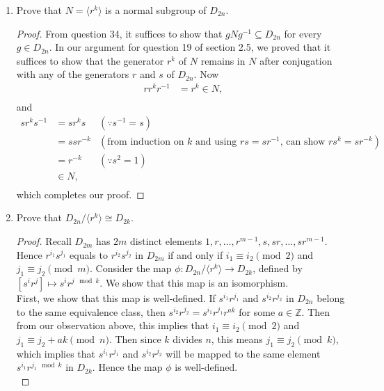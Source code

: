 \documentclass{article}
\begin{document}
\begin{enumerate}
\begin{enumerate}
        \begin{enumerate}
          \item Prove that $N=\langle r^k\rangle$ is a normal subgroup of
            $D_{2n}$.
            \begin{proof}
              From question 34, it suffices to show that $gNg^{-1}\subseteq
              D_{2n}$ for every $g\in D_{2n}$. In our argument for question
              19 of section 2.5, we proved that it suffices to show
              that the generator $r^k$ of $N$ remains in $N$ after
              conjugation with any of the generators $r$ and $s$ of
              $D_{2n}$. Now
              \begin{align*}
                rr^kr^{-1}  &= r^k\in N, \\
              \end{align*}
              and
              \begin{align*}
                sr^ks^{-1}  &= sr^ks    & (\because s^{-1}=s) \\
                            &= ssr^{-k} & (\text{from induction on $k$ and
                            using $rs=sr^{-1}$, can show $rs^k=sr^{-k}$}) \\
                            &= r^{-k}   & (\because s^2=1) \\
                            &\in N,     & \\
              \end{align*}
              which completes our proof.
            \end{proof}

          \item Prove that $D_{2n}/\langle r^k\rangle\cong D_{2k}$.
            \begin{proof}
              Recall $D_{2m}$ has $2m$ distinct elements
              $1,r,\ldots,r^{m-1},s,sr,\ldots,sr^{m-1}$. Hence
              $r^{i_1}s^{j_1}$ equals to $r^{i_2}s^{j_2}$ in $D_{2m}$ if
              and only if $i_1\equiv i_2 \pmod{2}$ and $j_1\equiv
              j_2\pmod{m}$. Consider the map $\phi:D_{2n}/\langle
              r^k\rangle\rightarrow D_{2k}$, defined by $[s^ir^j]\mapsto
              s^ir^{j\mod k}$. We show that this map is an isomorphism. \\

              First, we show that this map is well-defined. If
              $s^{i_1}r^{j_1}$ and $s^{i_2}r^{j_2}$ in $D_{2n}$ belong to
              the same equivalence class, then
              $s^{i_2}r^{j_2}=s^{i_1}r^{j_1}r^{ak}$ for some
              $a\in\mathbb{Z}$. Then from our observation above, this
              implies that $i_1\equiv i_2 \pmod{2}$ and $j_1\equiv
              j_2+ak\pmod{n}$. Then since $k$ divides $n$, this means
              $j_1\equiv j_2\pmod{k}$, which implies that $s^{i_1}r^{j_1}$
              and $s^{i_2}r^{j_2}$ will be mapped to the same element
              $s^{i_1}r^{j_1\mod{k}}$ in $D_{2k}$. Hence the map $\phi$ is
              well-defined. \\


\end{proof}
\end{enumerate}
\end{enumerate}
\end{enumerate}
\end{document}
